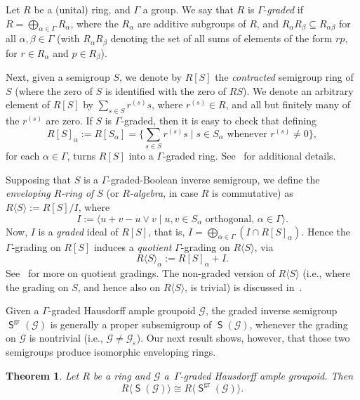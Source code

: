 \documentclass[a4paper,reqno,12pt]{amsart}
\numberwithin{equation}{section}
\theoremstyle{plain}
\newtheorem{thm}{Theorem}[section]
\theoremstyle{definition}
\newcommand{\gr}{\operatorname{gr}}
\newcommand{\SG}{\operatorname{\mathsf{S}}}
\begin{document}
Let $R$ be a (unital) ring, and $\Gamma$ a group. We say that $R$ is $\Gamma$-\emph{graded} if $R = \bigoplus_{\alpha \in \Gamma} R_\alpha$, where the $R_\alpha$ are additive subgroups of $R$, and $R_\alpha R_\beta \subseteq R_{\alpha \beta}$ for all $\alpha, \beta \in \Gamma$ (with $R_\alpha R_\beta$ denoting the set of all sums of elements of the form $rp$, for $r \in R_\alpha$ and $p \in R_\beta$).

Next, given a semigroup $S$, we denote by $R[S]$ the \emph{contracted} semigroup ring of $S$ (where the zero of $S$ is identified with the zero of $RS$). We denote an arbitrary element of $R[S]$ by $\sum_{s\in S} r^{(s)}s$, where $r^{(s)} \in R$, and all but finitely many of the $r^{(s)}$ are zero. If $S$ is $\Gamma$-graded, then it is easy to check that defining 
\[R[S]_{\alpha} := R[S_{\alpha}] = \Big\{\sum_{s\in S} r^{(s)}s \mid s \in S_\alpha \text{ whenever } r^{(s)}\neq 0\Big\},\]
for each $\alpha \in \Gamma$, turns $R[S]$ into a $\Gamma$-graded ring. See~\cite[Section 7]{RZ} for additional details.

Supposing that $S$ is a $\Gamma$-graded-Boolean inverse semigroup, we define the \emph{enveloping $R$-ring of $S$} (or \emph{$R$-algebra}, in case $R$ is commutative) as $R\langle S \rangle := R[S]/I$, where
\begin{equation*}
I := \langle u+v-u\vee v \mid u, v \in S_{\alpha} \text{ orthogonal, } \alpha \in \Gamma \rangle.
\end{equation*} 
Now, $I$ is a \emph{graded} ideal of $R[S]$, that is, $I = \bigoplus_{\alpha \in \Gamma}(I \cap R[S]_{\alpha})$. Hence the $\Gamma$-grading on $R[S]$ induces a \emph{quotient} $\Gamma$-grading on $R\langle S \rangle$, via 
\[R\langle S \rangle_{\alpha} := R[S]_{\alpha} + I.\]
See~\cite[Section 1.1.5]{hazi} for more on quotient gradings. The non-graded version of $R\langle S \rangle$ (i.e., where the grading on $S$, and hence also on $R\langle S \rangle$, is trivial) is discussed in~\cite[\S 6.3]{wehrung}.  

Given a $\Gamma$-graded Hausdorff ample groupoid $\mathscr{G}$, the graded inverse semigroup $\SG^{\gr}(\mathscr{G})$ is generally a proper subsemigroup of $\SG(\mathscr{G})$, whenever the grading on $\mathscr{G}$ is nontrivial (i.e., $\mathscr{G} \neq \mathscr{G}_{\varepsilon}$). Our next result shows, however, that those two semigroups produce isomorphic enveloping rings.

\begin{thm}
Let $R$ be a ring and $\mathscr{G}$ a $\, \Gamma$-graded Hausdorff ample groupoid. Then
\[R\langle \SG(\mathscr{G}) \rangle \cong R\langle \SG^{\gr}(\mathscr{G}) \rangle.\]
\end{thm}
\end{document}
